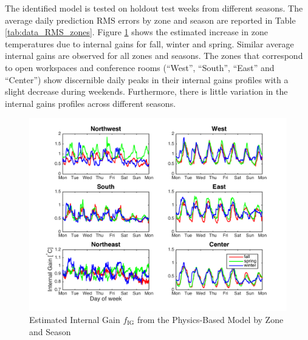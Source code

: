 The identified model is tested on holdout test weeks from different seasons. The average daily prediction RMS errors by zone and season are reported in Table \ref{tab:data_RMS_zones}. Figure \ref{fig:physics_qig} shows the estimated increase in zone temperatures due to internal gains for fall, winter and spring. %
Similar average internal gains are observed for all zones and seasons. The zones that correspond to open workspaces and conference rooms (``West'', ``South'', ``East'' and ``Center'') show discernible daily peaks in their internal gains profiles with a slight decrease during weekends. Furthermore, there is little variation in the internal gains profiles across different seasons.
\begin{figure}
	\centering
	\vspace*{-0.3cm}
	\includegraphics[scale=0.46]{chapters/building_model/figures/physics_qig.png}
	\vspace*{-0.2cm}
	\caption{Estimated Internal Gain $f_{\text{IG}}$ from the Physics-Based Model by Zone and Season}
	\vspace*{-0.5cm}
	\label{fig:physics_qig}
\end{figure}